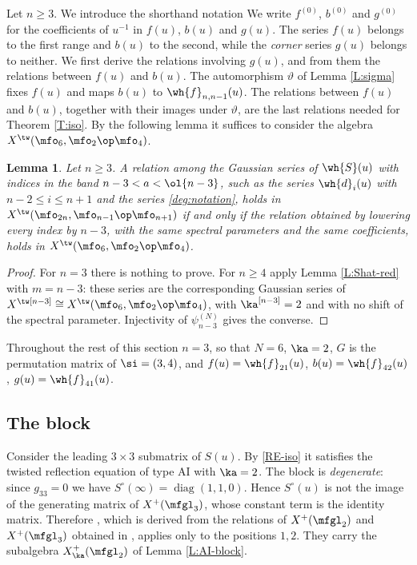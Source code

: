 \documentclass{amsart}
\newtheorem{lemma}[theorem]{Lemma}
\numberwithin{equation}{section}
\theoremstyle{remark}
\DeclareMathOperator{\diag}{diag}
\renewcommand{\,}{\kern 0.1em} %
\begin{document}
Let $n\ge3$. We introduce the shorthand notation
%
%
We write $f^{(0)}$, $b^{(0)}$ and $g^{(0)}$ for the coefficients of $u^{-1}$ in
$f(u)$, $b(u)$ and $g(u)$.
The series $f(u)$ belongs to the first range and $b(u)$ to the second, while the {\it corner}
series $g(u)$ belongs to neither. We first derive the relations involving $g(u)$, and from them
the relations between $f(u)$ and $b(u)$. The automorphism $\vartheta$ of Lemma \ref{L:sigma}
fixes $f(u)$ and maps $b(u)$ to $\wh{f}_{n,n-1}(u)$. The relations between $f(u)$ and $b(u)$,
together with their images under $\vartheta$, are the last relations needed for Theorem
\ref{T:iso}. %
By the following lemma it suffices to consider the algebra $X^\tw(\mfo_6,\mfo_2\op\mfo_4)$.

\begin{lemma} \label{L:reduce-to-3}
%
Let $n\ge3$. A relation among the Gaussian series of $\wh{S}(u)$ with indices in the band
$n-3<a<\ol{n-3}$, such as the series $\wh{d}_{i}(u)$ with $n-2\le i \le n+1$ and the series
\eqref{deg:notation}, holds in $X^\tw(\mfo_{2n},\mfo_{n-1}\op\mfo_{n+1})$ if and only if the relation obtained by lowering every index by $n-3$, with the same spectral
parameters and the same coefficients, holds in $X^\tw(\mfo_6,\mfo_2\op\mfo_4)$.
%
\end{lemma}

\begin{proof}
%
For $n=3$ there is nothing to prove. For $n\ge4$ apply Lemma \ref{L:Shat-red} with $m=n-3$: these series are the corresponding Gaussian series of
$X^{\tw[n-3]}\cong X^\tw(\mfo_6,\mfo_2\op\mfo_4)$, with $\ka^{[n-3]}=2$ and with no shift of the
spectral parameter. Injectivity of $\psi^{(N)}_{n-3}$ gives the converse.
%
\end{proof}

Throughout the rest of this section $n=3$, so that $N=6$, $\ka=2$, $G$ is the permutation
matrix of $\si=(3,4)$, and $f(u) = \wh{f}_{21}(u)$, $b(u) = \wh{f}_{42}(u)$, $g(u) = \wh{f}_{41}(u)$.


\subsection{The block} \label{sec:blocks}

Consider the leading $3\times3$ submatrix
%
%
of $S(u)$. By \eqref{RE-iso} it satisfies the twisted reflection equation of type AI with
$\ka=2$. The block is {\it degenerate}: since $g_{33}=0$ we
have $S^\circ(\infty) = \diag(1,1,0)$. Hence $S^\circ(u)$ is not the image of the generating
matrix of $X^+(\mfgl_3)$, whose constant term is the identity matrix. Therefore \cite[Lem.~5.1]{Re26},
which is derived from the relations of $X^+(\mfgl_2)$ and $X^+(\mfgl_3)$ obtained in \cite{LWZ25a},
applies only to the positions $1,2$. They carry the subalgebra $X^+_\ka(\mfgl_2)$ of Lemma \ref{L:AI-block}.
\end{document}
